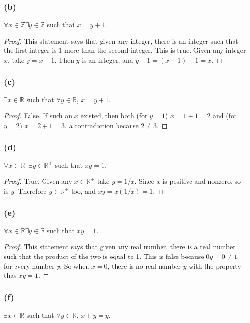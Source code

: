 \documentclass[14pt]{extarticle}
\newcommand{\R}{\mathbb{R}}
\newcommand{\Z}{\mathbb{Z}}
\newcommand{\fa}{\forall}
\newcommand{\te}{\exists}
\begin{document}
\subsubsection{(b)}
$\fa x \in \Z \te y \in \Z$ such that $x = y + 1$.

\begin{proof}
This statement says that given any integer, there is an integer such that the first integer is 1 more than the second integer. This is true. Given any integer $x$, take $y = x - 1$. Then $y$ is an integer, and $y + 1 = (x - 1) + 1 = x$.
\end{proof}

\subsubsection{(c)}
$\te x \in \R$ such that $\fa y \in \R$, $x = y + 1$.

\begin{proof}
False. If such an $x$ existed, then both (for $y = 1$) $x = 1 + 1 = 2$ and (for $y = 2$) $x = 2 + 1 = 3$, a contradiction because $2 \neq 3$.
\end{proof}

\subsubsection{(d)}
$\fa x \in \R^+ \te y \in \R^+$ such that $xy = 1$.

\begin{proof}
True. Given any $x \in \R^+$ take $y = 1/x$. Since $x$ is positive and nonzero, so is $y$. Therefore $y \in \R^+$ too, and $xy = x(1/x) = 1$.
\end{proof}

\subsubsection{(e)}
$\fa x \in \R \te y \in \R$ such that $xy = 1$.

\begin{proof}
This statement says that given any real number, there is a real number such that the product of the two is equal to 1. This is false because $0y = 0 \neq 1$ for every number $y$. So when $x = 0$, there is no real number $y$ with the property that $xy = 1$.
\end{proof}

\subsubsection{(f)}
$\te x \in \R$ such that $\fa y \in \R$, $x + y = y$.
\end{document}
